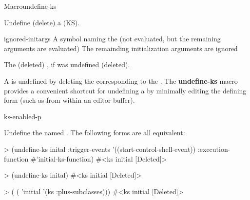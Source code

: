 \documentclass[10pt,twoside,english,pdftex]{article}
\begin{document}

\begin{functiondoc}{Macro}{undefine-ks}{  
   \returns{} }
%
%
%

\fnsyntax

\fnpurpose Undefine (delete) a  (KS).

\fnpackage {}

\fnmodule {}

\fnargs
\begin{args}{ignored-initargs}
\arg[ks-name] A symbol naming the  (not evaluated, but the remaining
arguments are evaluated)
 The remainding initialization arguments are ignored
\end{args}

\fnreturns The (deleted)  , if
  was undefined (deleted).

\fndescription A  is undefined by deleting the 
corresponding to the .  The \textbf{undefine-ks} macro provides a
convenient shortcut for undefining a  by minimally editing the
defining form (such as from within an editor buffer).

\begin{alsos}{ks-enabled-p}
\also[define-ks]
\also[ks-enabled-p]
\end{alsos}

\fnexamples
Undefine the  named . The following forms are all
equivalent:
\begin{example}
> (undefine-ks inital
     :trigger-events '((start-control-shell-event)) 
     :execution-function #'initial-ks-function)
#<ks initial [Deleted]>
\end{example}
\begin{example}
> (undefine-ks inital)
#<ks initial [Deleted]>
\end{example}
\begin{example}
> ( 
     ( 'initial '(ks :plus-subclasses)))
#<ks initial [Deleted]>
\end{example}

\end{functiondoc}
\end{document}
